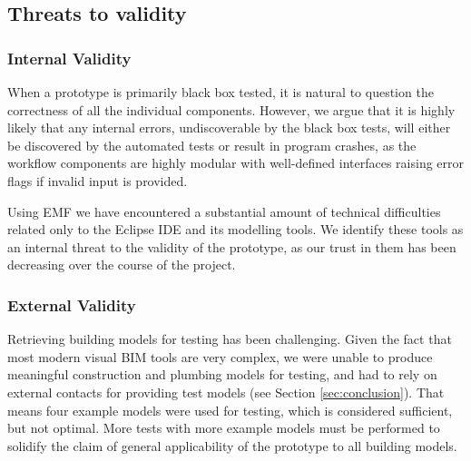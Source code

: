 \subsection{Threats to validity}
\subsubsection{Internal Validity} When a prototype is primarily black box tested, it is natural to question the correctness of all the individual components. However, we argue that it is highly likely that any internal errors, undiscoverable by the black box tests, will either be discovered by the automated tests or result in program crashes, as the workflow components are highly modular with well-defined interfaces raising error flags if invalid input is provided.

Using EMF we have encountered a substantial amount of technical difficulties related only to the Eclipse IDE and its modelling tools. We identify these tools as an internal threat to the validity of the prototype, as our trust in them has been decreasing over the course of the project.

\subsubsection{External Validity} Retrieving building models for testing has been challenging. Given the fact that most modern visual BIM tools are very complex, we were unable to produce meaningful construction and plumbing models for testing, and had to rely on external contacts for providing test models (see Section \ref{sec:conclusion}). That means four example models were used for testing, which is considered sufficient, but not optimal. More tests with more example models must be performed to solidify the claim of general applicability of the prototype to all building models.







